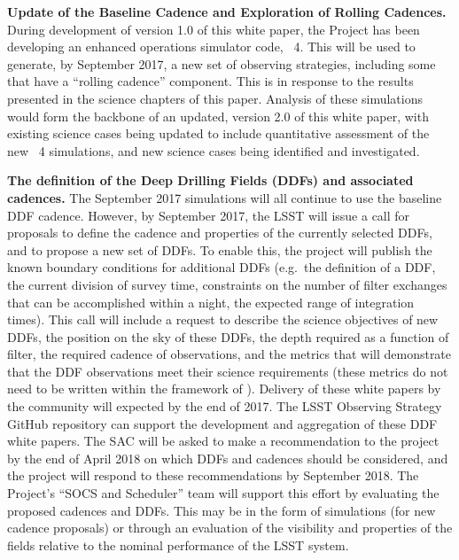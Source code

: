 \begin{description}

\item{\textbf{Update of the Baseline Cadence and Exploration of Rolling
Cadences.}} During development of version 1.0 of this white paper, the
Project has been developing an enhanced operations simulator code,
\OpSim~4. This will be used to generate, by September 2017, a new set of
observing strategies, including some that have a ``rolling cadence''
component. This is in response to the results presented in the science
chapters of this paper. Analysis of these simulations would form the
backbone of an updated, version 2.0 of this white paper, with existing
science cases being updated to include quantitative assessment of the
new \OpSim~4 simulations, and new science cases being identified and
investigated.

\item{\textbf{The definition of the Deep Drilling Fields (DDFs) and
associated cadences.}} The September 2017 simulations will all continue
to use the baseline DDF cadence. However, by September 2017, the LSST
will issue a call for proposals to define the cadence and properties of
the currently selected DDFs, and to propose a new set of DDFs. To enable
this, the project will publish the known boundary conditions for
additional DDFs (e.g.\ the definition of a DDF, the current division of
survey time, constraints on the number of filter exchanges that can be
accomplished within a night, the expected range of integration times).
This call will include a request to describe the science objectives of
new DDFs, the position on the sky of these DDFs, the depth required as a
function of filter, the required cadence of observations, and the
metrics that will demonstrate that the DDF observations meet their
science requirements (these metrics do not need to be written within the
framework of \MAF). Delivery of these white papers by the community will
expected by the end of 2017.  The LSST Observing Strategy GitHub
repository can support the development and aggregation of these DDF
white papers. The SAC will be asked to make a recommendation to the
project by the end of April 2018 on which DDFs and cadences should be
considered, and the project will respond to these recommendations by
September 2018. The Project's ``SOCS and Scheduler'' team will support
this effort by evaluating the proposed cadences and DDFs. This may be in
the form of simulations (for new cadence proposals) or through an
evaluation of the visibility and properties of the fields relative to
the nominal performance of the LSST system.


\end{description}
